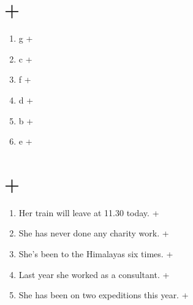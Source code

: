 \documentclass[a4paper, fontsize=10bp]{article} %
\begin{document}
\section{+}

\begin{enumerate}
    \item g +
    \item c +
    \item f +
    \item d +
    \item b +
    \item e +
\end{enumerate}

\section{+}

\begin{enumerate}
    \item Her train will leave at 11.30 today. +
    \item She has never done any charity work. +
    \item She’s been to the Himalayas six times. +
    \item Last year she worked as a consultant. +
    \item She has been on two expeditions this year. +
\end{enumerate}
\end{document}
